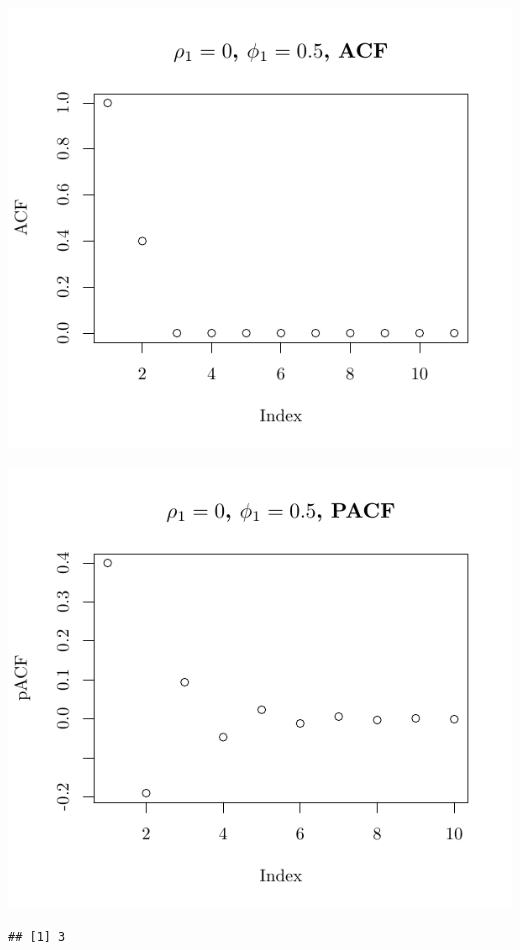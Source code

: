\documentclass[10pt]{paper}\usepackage[]{graphicx}\usepackage[]{color}
\makeatletter
\def\maxwidth{ %
  \ifdim\Gin@nat@width>\linewidth
    \linewidth
  \else
    \Gin@nat@width
  \fi
}
\newenvironment{kframe}{%
 \def\at@end@of@kframe{}%
 \ifinner\ifhmode%
  \def\at@end@of@kframe{\end{minipage}}%
  \begin{minipage}{\columnwidth}%
 \fi\fi%
 \def\FrameCommand##1{\hskip\@totalleftmargin \hskip-\fboxsep
 \colorbox{shadecolor}{##1}\hskip-\fboxsep
     \hskip-\linewidth \hskip-\@totalleftmargin \hskip\columnwidth}%
 \MakeFramed {\advance\hsize-\width
   \@totalleftmargin\z@ \linewidth\hsize
   \@setminipage}}%
 {\par\unskip\endMakeFramed%
 \at@end@of@kframe}
\newenvironment{knitrout}{}{} %
\makeatother
\begin{document}
\begin{knitrout}
{}




{\centering \includegraphics[width=\maxwidth]{figure/graphics-plotter-3} 

}




{\centering \includegraphics[width=\maxwidth]{figure/graphics-plotter-4} 

}


\begin{kframe}\begin{verbatim}
## [1] 3
\end{verbatim}
\end{kframe}


\end{knitrout}
\end{document}
